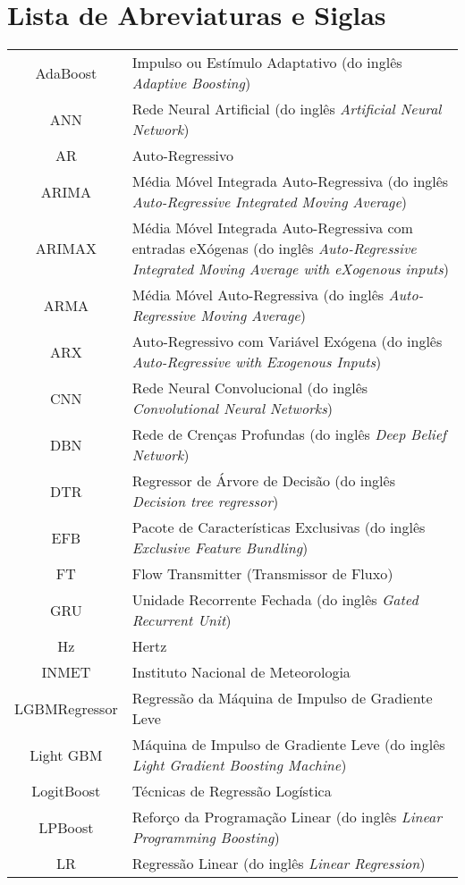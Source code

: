 \newpage
{}
\section*{Lista de Abreviaturas e Siglas}



\begin{tabular}{cp{}}
	AdaBoost & Impulso ou Estímulo Adaptativo (do inglês \textit{Adaptive Boosting}) \\
	ANN & Rede Neural Artificial (do inglês \textit{Artificial Neural Network}) \\
	AR & Auto-Regressivo\\
	ARIMA & Média Móvel Integrada Auto-Regressiva (do inglês \textit{Auto-Regressive Integrated Moving Average}) \\
	ARIMAX & Média Móvel Integrada Auto-Regressiva com entradas eXógenas (do inglês \textit{Auto-Regressive Integrated Moving Average with eXogenous inputs})\\
	ARMA & Média Móvel Auto-Regressiva (do inglês \textit{Auto-Regressive Moving Average}) \\
	ARX & Auto-Regressivo com Variável Exógena (do inglês \textit{Auto-Regressive with Exogenous Inputs})\\
	CNN & Rede Neural Convolucional (do inglês \textit{Convolutional Neural Networks})\\
	DBN & Rede de Crenças Profundas (do inglês \textit{Deep Belief Network}) \\
	DTR & Regressor de Árvore de Decisão (do inglês \textit{Decision tree regressor}) \\
	EFB & Pacote de Características Exclusivas (do inglês \textit{Exclusive Feature Bundling})\\
	FT & Flow Transmitter (Transmissor de Fluxo)\\
	GRU & Unidade Recorrente Fechada (do inglês \textit{Gated Recurrent Unit}) \\
	Hz & Hertz\\
	INMET & Instituto Nacional de Meteorologia\\
	LGBMRegressor & Regressão da Máquina de Impulso de Gradiente Leve\\
	Light GBM & Máquina de Impulso de Gradiente Leve (do inglês \textit{Light Gradient Boosting Machine}) \\
	LogitBoost & Técnicas de Regressão Logística\\
	LPBoost & Reforço da Programação Linear (do inglês \textit{Linear Programming Boosting}) \\
	LR & Regressão Linear (do inglês \textit{Linear Regression})	
\end{tabular}

